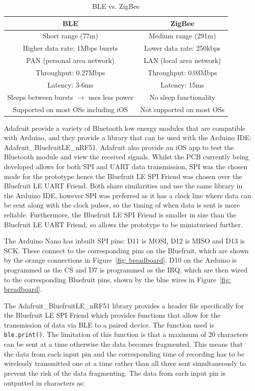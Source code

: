 \begin{table}[h!]
\centering
\begin{tabular}{||c c||} 
 \hline
 BLE & ZigBee \\ [0.5ex] 
 \hline\hline
 Short range (77m) & Medium range (291m) \\
 Higher data rate: 1Mbps bursts & Lower data rate: 250kbps \\ 
 PAN (personal area network) & LAN (local area network) \\
 Throughput: 0.27Mbps & Throughput: 0.03Mbps \\
 Latency: 3-6ms & Latency: 15ms \\
 Sleeps between bursts $\rightarrow$ uses less power & No sleep functionality \\
 Supported on most OSs including iOS & Not supported on most OSs \\
 \hline
\end{tabular}
\caption{BLE vs. ZigBee \cite{Ray2015, Christiano}}
\label{table:BLE vs ZigBee}
\end{table}

Adafruit provide a variety of Bluetooth low energy modules that are compatible with Arduino, and they provide a library that can be used with the Arduino IDE: Adafruit\_BluefruitLE\_nRF51. Adafruit also provide an iOS app to test the Bluetooth module and view the received signals. Whilst the PCB currently being developed allows for both SPI and UART data transmission, SPI was the chosen mode for the prototype hence the Bluefruit LE SPI Friend was chosen over the Bluefruit LE UART Friend. Both share similarities and use the same library in the Arduino IDE, however SPI was preferred as it has a clock line where data can be sent along with the clock pulses, so the timing of when data is sent is more reliable. Furthermore, the Bluefruit LE SPI Friend is smaller in size than the Bluefruit LE UART Friend, so allows the prototype to be miniaturised further. 

The Arduino Nano has inbuilt SPI pins: D11 is MOSI, D12 is MISO and D13 is SCK. These connect to the corresponding pins on the Bluefruit, which are shown by the orange connections in Figure~\ref{fig: breadboard}. D10 on the Arduino is programmed as the CS and D7 is programmed as the IRQ, which are then wired to the corresponding Bluefruit pins, shown by the blue wires in Figure~\ref{fig: breadboard}. 

The Adafruit\_BluefruitLE\_nRF51 library provides a header file specifically for the Bluefruit LE SPI Friend which provides functions that allow for the transmission of data via BLE to a paired device. The function used is {\tt{ble.print()}}. The limitation of this function is that a maximum of 20 characters can be sent at a time otherwise the data becomes fragmented. This means that the data from each input pin and the corresponding time of recording has to be wirelessly transmitted one at a time rather than all three sent simultaneously to prevent the risk of the data fragmenting. The data from each input pin is outputted in characters as:

